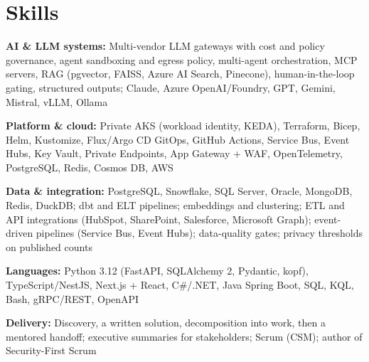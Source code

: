 \documentclass[10pt,letterpaper]{article}
\newcommand{\szmeta}{\fontsize{8pt}{10pt}\selectfont}
\begin{document}
\section*{Skills}
{\szmeta \textbf{AI \& LLM systems:} Multi-vendor LLM gateways with cost and policy governance, agent sandboxing and egress policy, multi-agent orchestration, MCP servers, RAG (pgvector, FAISS, Azure AI Search, Pinecone), human-in-the-loop gating, structured outputs; Claude, Azure OpenAI/Foundry, GPT, Gemini, Mistral, vLLM, Ollama\par\vspace{2pt}\textbf{Platform \& cloud:} Private AKS (workload identity, KEDA), Terraform, Bicep, Helm, Kustomize, Flux/Argo CD GitOps, GitHub Actions, Service Bus, Event Hubs, Key Vault, Private Endpoints, App Gateway + WAF, OpenTelemetry, PostgreSQL, Redis, Cosmos DB, AWS\par\vspace{2pt}\textbf{Data \& integration:} PostgreSQL, Snowflake, SQL Server, Oracle, MongoDB, Redis, DuckDB; dbt and ELT pipelines; embeddings and clustering; ETL and API integrations (HubSpot, SharePoint, Salesforce, Microsoft Graph); event-driven pipelines (Service Bus, Event Hubs); data-quality gates; privacy thresholds on published counts\par\vspace{2pt}\textbf{Languages:} Python 3.12 (FastAPI, SQLAlchemy 2, Pydantic, kopf), TypeScript/NestJS, Next.js + React, C\#/.NET, Java Spring Boot, SQL, KQL, Bash, gRPC/REST, OpenAPI\par\vspace{2pt}\textbf{Delivery:} Discovery, a written solution, decomposition into work, then a mentored handoff; executive summaries for stakeholders; Scrum (CSM); author of Security-First Scrum}\par
\end{document}
